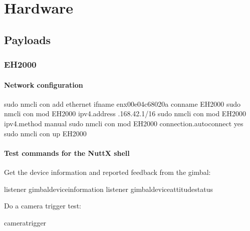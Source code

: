 \documentclass[letterpaper,10pt,english]{sphinxmanual}
\begin{document}
\chapter{Hardware}
\label{\detokenize{source/hardware:hardware}}\label{\detokenize{source/hardware::doc}}

\section{Payloads}
\label{\detokenize{source/hardware/payloads:payloads}}\label{\detokenize{source/hardware/payloads::doc}}

\subsection{EH2000}
\label{\detokenize{source/hardware/payloads/eh2000:eh2000}}\label{\detokenize{source/hardware/payloads/eh2000::doc}}

\subsubsection{Network configuration}
\label{\detokenize{source/hardware/payloads/eh2000:network-configuration}}
\begin{sphinxVerbatim}[commandchars=\\\{\}]
sudo nmcli con add  ethernet ifname enx00e04c68020a con\PYGZhy{}name EH2000
sudo nmcli con mod EH2000 ipv4.address .168.42.1/16
sudo nmcli con mod EH2000 ipv4.method manual
sudo nmcli con mod EH2000 connection.autoconnect yes
sudo nmcli con up EH2000
\end{sphinxVerbatim}


\subsubsection{Test commands for the NuttX shell}
\label{\detokenize{source/hardware/payloads/eh2000:test-commands-for-the-nuttx-shell}}
Get the device information and reported feedback from the gimbal:

\begin{sphinxVerbatim}[commandchars=\\\{\}]
listener gimbal\PYGZus{}device\PYGZus{}information
listener gimbal\PYGZus{}device\PYGZus{}attitude\PYGZus{}status
\end{sphinxVerbatim}

Do a camera trigger test:

\begin{sphinxVerbatim}[commandchars=\\\{\}]
camera\PYGZus{}trigger 
\end{sphinxVerbatim}
\end{document}
